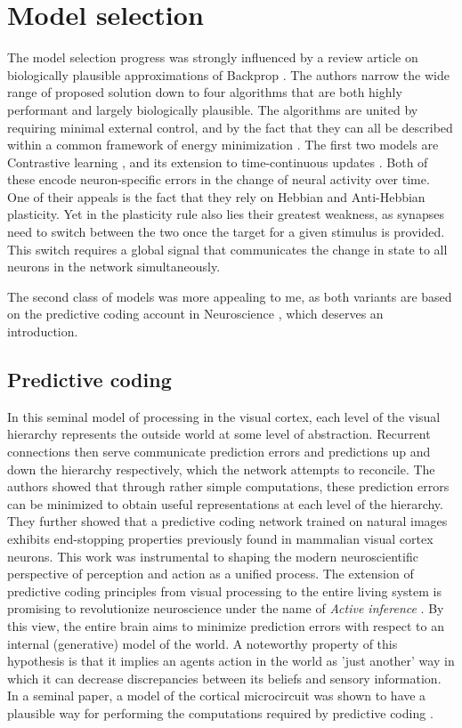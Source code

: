 \section{Model selection}

The model selection progress was strongly influenced by a review article on biologically plausible approximations of
Backprop \citep{whittington2019theories}. The authors narrow the wide range of proposed solution down to four algorithms
that are both highly performant and largely biologically plausible. The algorithms are united by requiring minimal
external control, and by the fact that they can all be described within a common framework of energy minimization
\citep{Scellier2017}. The first two models are Contrastive learning \cite{OReilly1996}, and its extension to
time-continuous updates \citep{Bengio2017}. Both of these encode neuron-specific errors in the change of neural activity
over time. One of their appeals is the fact that they rely on Hebbian and Anti-Hebbian plasticity. Yet in the plasticity
rule also lies their greatest weakness, as synapses need to switch between the two once the target for a given stimulus
is provided. This switch requires a global signal that communicates the change in state to all neurons in the network
simultaneously.

The second class of models was more appealing to me, as both variants are based on the predictive coding account in
Neuroscience \citep{rao1999predictive}, which deserves an introduction.

\subsection{Predictive coding}

In this seminal model of processing in the visual cortex, each level of the visual hierarchy represents the outside
world at some level of abstraction. Recurrent connections then serve communicate prediction errors and predictions up
and down the hierarchy respectively, which the network attempts to reconcile. The authors showed that through rather
simple computations, these prediction errors can be minimized to obtain useful representations at each level of the
hierarchy. They further showed that a predictive coding network trained on natural images exhibits end-stopping
properties previously found in mammalian visual cortex neurons. This work was instrumental to shaping the modern
neuroscientific perspective of perception and action as a unified process. The extension of predictive coding principles
from visual processing to the entire living system is promising to revolutionize neuroscience under the name of
\textit{Active inference} \citep{Friston2008,Friston2009,Adams2015}. By this view, the entire brain aims to minimize
prediction errors with respect to an internal (generative) model of the world. A noteworthy property of this hypothesis
is that it implies an agents action in the world as 'just another' way in which it can decrease discrepancies between
its beliefs and sensory information. In a seminal paper, a model of the cortical microcircuit
\citep{haeusler2007statistical} was shown to have a plausible way for performing the computations required by predictive
coding \citep{bastos2012canonical}.

